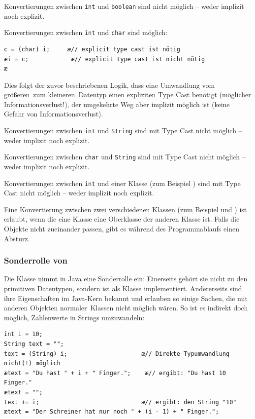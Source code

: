 \begin{compactitem}
\item Konvertierungen zwischen \lstinline|int| und \lstinline|boolean| sind
nicht möglich -- weder implizit noch explizit.

\item Konvertierungen zwischen \lstinline|int| und \lstinline|char| sind möglich:

\begin{lstlisting}
c = (char) i;     æ// explicit type cast ist nötig
æi = c;            æ// explicit type cast ist nicht nötig
æ\end{lstlisting}

Dies folgt der zuvor beschriebenen Logik, dass eine Umwandlung vom \glqq
größeren\grqq\ zum \glqq kleineren\grqq\ Datentyp einen expliziten Type Cast
benötigt (möglicher Informationsverlust!), der umgekehrte Weg aber implizit
möglich ist (keine Gefahr von Informationsverlust).

\item Konvertierungen zwischen \lstinline|int| und \lstinline|String| sind
mit Type Cast nicht möglich -- weder implizit noch explizit.

\item Konvertierungen zwischen \lstinline|char| und \lstinline|String| sind
mit Type Cast nicht möglich -- weder implizit noch explizit.

\item Konvertierungen zwischen \lstinline|int| und einer Klasse
(zum Beispiel ) sind mit Type Cast nicht möglich -- weder
implizit noch explizit.

\item Eine Konvertierung zwischen zwei verschiedenen Klassen (zum Beispiel
 und ) ist erlaubt, wenn die eine Klasse
eine Oberklasse der anderen Klasse ist. Falls die Objekte nicht zueinander
passen, gibt es während des Programmablaufs einen Absturz.
\end{compactitem}

\subsubsection{Sonderrolle von }

Die Klasse  nimmt in Java eine Sonderrolle ein: Einerseits
gehört sie nicht zu den primitiven Datentypen, sondern ist als Klasse
implementiert. Andererseits sind ihre Eigenschaften im Java-Kern bekannt und
erlauben so einige Sachen, die mit anderen Objekten \glqq normaler\grqq\ Klassen
nicht möglich wären. So ist es indirekt doch möglich, Zahlenwerte in Strings
umzuwandeln:

\begin{lstlisting}
int i = 10;
String text = "";
text = (String) i;                     æ// Direkte Typumwandlung nicht(!) möglich 
ætext = "Du hast " + i + " Finger.";    æ// ergibt: "Du hast 10 Finger."
ætext = "";
text += i;                             æ// ergibt: den String "10"
ætext = "Der Schreiner hat nur noch " + (i - 1) + " Finger.";
\end{lstlisting}
